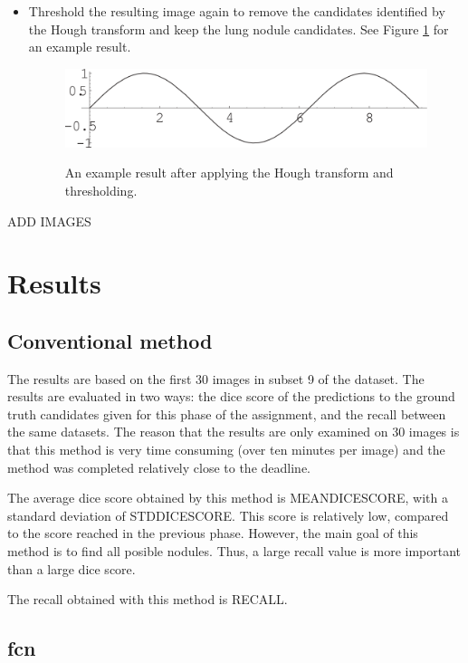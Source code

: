 \documentclass{article}
\begin{document}
\begin{itemize}
\item Threshold the resulting image again to remove the candidates identified by the Hough transform and keep the lung nodule candidates. See Figure \ref{figure:Houghresult} for an example result.
\begin{figure}[h]
\centering
{\includegraphics[width=0.7\linewidth]{./figure.png}}
\caption{An example result after applying the Hough transform and thresholding. \label{figure:Houghresult}}
\end{figure}
\end{itemize}
ADD IMAGES



\section{Results}\label{sec:results}
\subsection{Conventional method}
The results are based on the first 30 images in subset 9 of the dataset. The results are evaluated in two ways: the dice score of the predictions to the ground truth candidates given for this phase of the assignment, and the recall between the same datasets. The reason that the results are only examined on 30 images is that this method is very time consuming (over ten minutes per image) and the method was completed relatively close to the deadline.

The average dice score obtained by this method is MEANDICESCORE, with a standard deviation of STDDICESCORE. This score is relatively low, compared to the score reached in the previous phase. However, the main goal of this method is to find all posible nodules. Thus, a large recall value is more important than a large dice score.

The recall obtained with this method is RECALL.

\subsection{fcn}
\end{document}
